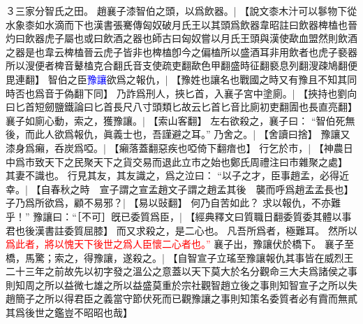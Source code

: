 ３三家分智氏之田。
趙襄子漆智伯之頭，以爲飲器。|{
	【說文桼木汁可以鬖物下從水象桼如水滴而下也漢書張騫傳匈奴破月氏王以其頭爲飲器韋昭註曰飲器椑榼也晉灼曰飲器虎子屬也或曰飲酒之器也師古曰匈奴嘗以月氏王頭與漢使歃血盟然則飲酒之器是也韋云椑榼晉云虎子皆非也椑榼卽今之偏榼所以盛酒耳非用飲者也虎子褻器所以溲便者椑音鼙榼克合翻氏音支使疏吏翻歃色甲翻盛時征翻褻息列翻溲疎鳩翻便毘連翻】}
智伯之臣\textcolor{blue}{豫讓}欲爲之報仇，|{
	【豫姓也讓名也戰國之時又有豫且不知其同時否也爲音于偽翻下同】}
乃詐爲刑人，挾匕首，入襄子宮中塗廁。|{
	【挾持也劉向曰匕首短劒鹽鐵論曰匕首長尺八寸頭類匕故云匕首匕音比廁初吏翻圊也長直亮翻】}
襄子如廁心動，索之，獲豫讓。|{
	【索山客翻】}
左右欲殺之，襄子曰：
	“智伯死無後，而此人欲爲報仇，眞義士也，吾謹避之耳。”
乃舍之。|{
	【舍讀曰捨】}
豫讓又漆身爲癩，呑炭爲啞。|{
	【癩落蓋翻惡疾也啞倚下翻瘖也】}
行乞於市，|{
	【神農日中爲市致天下之民聚天下之貨交易而退此立市之始也鄭氏周禮注曰市雜聚之處】}
其妻不識也。
行見其友，其友識之，爲之泣曰：
	“以子之才，臣事趙孟，必得近幸。|{
		【自春秋之時　宣子謂之宣孟趙文子謂之趙孟其後　襲而呼爲趙孟孟長也】}
	子乃爲所欲爲，顧不易邪？|{
		【易以䜴翻】}
	何乃自苦如此？
	求以報仇，不亦難乎！”
豫讓曰：“［不可］旣已委質爲臣，|{
	【經典釋文曰質職日翻委質委其體以事君也後漢書註委質屈膝】}
	而又求殺之，是二心也。
	凡吾所爲者，極難耳。
	然所以\textcolor{red}{爲此者，將以愧天下後世之爲人臣懷二心者也。”}
襄子出，豫讓伏於橋下。
襄子至橋，馬驚；索之，得豫讓，遂殺之。|{
	【自智宣子立瑤至豫讓報仇其事皆在威烈王二十三年之前故先以初字發之溫公之意蓋以天下莫大於名分觀命三大夫爲諸侯之事則知周之所以益微七雄之所以益盛莫重於宗社觀智趙立後之事則知智宣子之所以失趙簡子之所以得君臣之義當守節伏死而已觀豫讓之事則知策名委質者必有霣而無貳其爲後世之鑑豈不昭昭也哉】
	}

